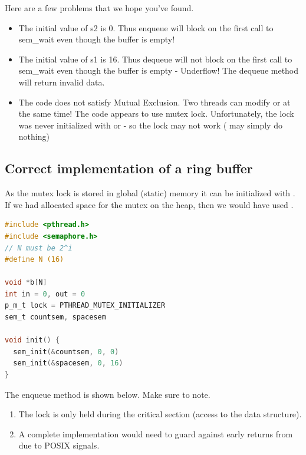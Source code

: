 Here are a few problems that we hope you've found.

\begin{itemize}
\tightlist
\item
  The initial value of s2 is 0.
  Thus enqueue will block on the first call to sem\_wait even though the buffer is empty!
\item
  The initial value of s1 is 16.
  Thus dequeue will not block on the first call to sem\_wait even though the buffer is empty - Underflow!
  The dequeue method will return invalid data.
\item
  The code does not satisfy Mutual Exclusion.
  Two threads can modify  or  at the same time!
  The code appears to use mutex lock. Unfortunately, the lock was never initialized with  or  - so the lock may not work ( may simply do nothing)
\end{itemize}

\subsection{Correct implementation of a ring buffer}

As the mutex lock is stored in global (static) memory it can be initialized with .
If we had allocated space for the mutex on the heap, then we would have used .

\begin{lstlisting}[language=C]
#include <pthread.h>
#include <semaphore.h>
// N must be 2^i
#define N (16)

void *b[N]
int in = 0, out = 0
p_m_t lock = PTHREAD_MUTEX_INITIALIZER
sem_t countsem, spacesem

void init() {
  sem_init(&countsem, 0, 0)
  sem_init(&spacesem, 0, 16)
}
\end{lstlisting}

The enqueue method is shown below.
Make sure to note.

\begin{enumerate}
\item The lock is only held during the critical section (access to the data structure).
\item A complete implementation would need to guard against early returns from  due to POSIX signals.
\end{enumerate}

